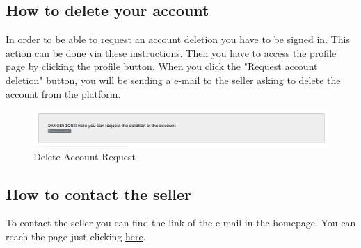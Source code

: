 \subsection{How to delete your account} \label{_delete}
In order to be able to request an account deletion you have to be signed in. This action can be done via these \hyperref[_signin]{instructions}.
Then you have to access the profile page by clicking the profile button.
When you click the "Request account deletion" button, you will be sending a e-mail to the seller asking to delete the account from the platform.
\begin{figure}[H]
    \centering
    \includegraphics[width=\linewidth]{res/images/cliente/delete.png}
    \caption{Delete Account Request}
\end{figure}

\subsection{How to contact the seller} \label{_contacts}
To contact the seller you can find the link of the e-mail in the homepage. You can reach the page just clicking \href{https://d28yg0rufs9lo7.cloudfront.net/}{here}.


